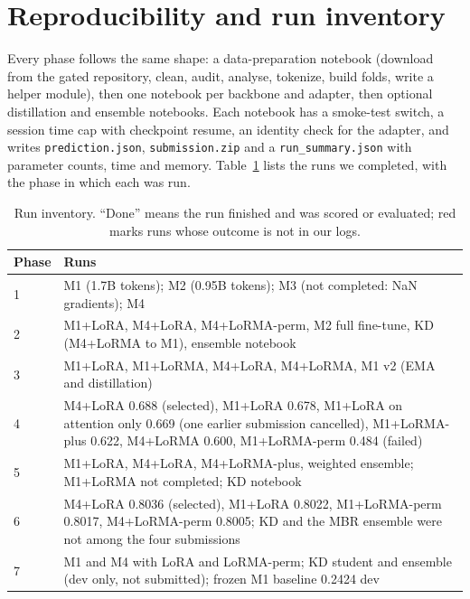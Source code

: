 \documentclass[11pt, oneside]{article}
\newif\ifappendix
\begin{document}
\ifappendix
\clearpage
\appendix
\section{Reproducibility and run inventory}
\label{app:hp}
Every phase follows the same shape: a data-preparation notebook (download from the gated repository, clean, audit, analyse, tokenize, build folds, write a helper module), then one notebook per backbone and adapter, then optional distillation and ensemble notebooks. Each notebook has a smoke-test switch, a session time cap with checkpoint resume, an identity check for the adapter, and writes \texttt{prediction.json}, \texttt{submission.zip} and a \texttt{run\_summary.json} with parameter counts, time and memory. Table~\ref{tab:inventory} lists the runs we completed, with the phase in which each was run.
\begin{table}[H]
\centering
\caption{Run inventory. ``Done'' means the run finished and was scored or evaluated; red marks runs whose outcome is not in our logs.}
\label{tab:inventory}
\small
\begin{tabularx}{\linewidth}{lX}
\toprule
Phase & Runs \\
\midrule
1 & M1 (1.7B tokens); M2 (0.95B tokens); M3 (not completed: NaN gradients); M4 \\
2 & M1+LoRA, M4+LoRA, M4+LoRMA-perm, M2 full fine-tune, KD (M4+LoRMA to M1), ensemble notebook \\
3 & M1+LoRA, M1+LoRMA, M4+LoRA, M4+LoRMA, M1 v2 (EMA and distillation) \\
4 & M4+LoRA 0.688 (selected), M1+LoRA 0.678, M1+LoRA on attention only 0.669 (one earlier submission cancelled), M1+LoRMA-plus 0.622, M4+LoRMA 0.600, M1+LoRMA-perm 0.484 (failed) \\
5 & M1+LoRA, M4+LoRA, M4+LoRMA-plus, weighted ensemble; M1+LoRMA not completed; KD notebook \\
6 & M4+LoRA 0.8036 (selected), M1+LoRA 0.8022, M1+LoRMA-perm 0.8017, M4+LoRMA-perm 0.8005; KD and the MBR ensemble were not among the four submissions \\
7 & M1 and M4 with LoRA and LoRMA-perm; KD student and ensemble (dev only, not submitted); frozen M1 baseline 0.2424 dev \\
\bottomrule
\end{tabularx}
\end{table}
\end{document}
